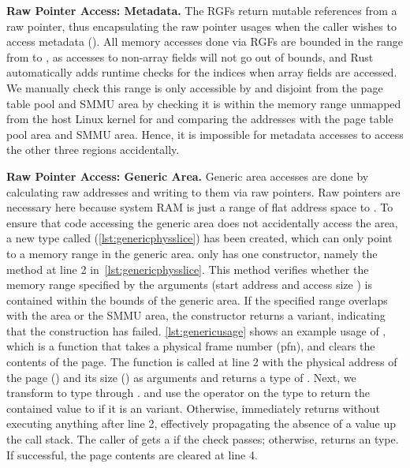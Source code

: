 \textbf{Raw Pointer Access: \rustcore{} Metadata.}
The RGFs return mutable references from a raw pointer, thus encapsulating the
raw pointer usages when the caller wishes to access \rustcore{} metadata
().
All memory accesses done via RGFs are bounded in the range
from  to
,
as accesses to non-array fields will not go out of bounds,
and Rust automatically adds runtime checks for the indices when array fields are accessed.
We manually check this range is only accessible by \rustcore{} and disjoint
from the page table pool and SMMU area by checking it is within the memory range unmapped from the
host Linux kernel for \rustcore{} and comparing the addresses with the page table pool area and SMMU area.
Hence, it is impossible for \rustcore{} metadata accesses to access
the other three regions accidentally.

\textbf{Raw Pointer Access: Generic Area.}
Generic area accesses are done by calculating raw addresses and writing to them
via raw pointers. Raw pointers are necessary here because system RAM is just a
range of flat address space to \rustcore{}. To ensure that code accessing the
generic area does not accidentally access the \rustcore{} area,
a new type called 
(\autoref{lst:genericphysslice}) has been created, which can only point to a
memory range in the generic area.
 only has one constructor, namely the 
method at line 2 in~\autoref{lst:genericphysslice}. This method verifies whether
the memory range specified by the arguments (start address  and
access size ) is contained within the bounds of the generic area.
If the specified range overlaps with the \rustcore{} area or the SMMU area, the constructor
returns a  variant, indicating that the construction has failed.
\autoref{lst:genericusage} shows an example usage of
, which is a function that takes a physical frame number
(pfn), and clears the contents of the page.
The  function is called at line 2 with the
physical address of the page () and its size
() as arguments and returns a type of
.
Next, we transform  to  type through .
and use the  operator on the  type to return the
contained value to  if it is an  variant.
Otherwise,  immediately returns 
without executing anything after line 2,
effectively propagating the absence of a value up the call stack.
The caller of  gets a
 if the check passes; otherwise,
 returns an  type.
If successful, the page contents are cleared at line 4.

